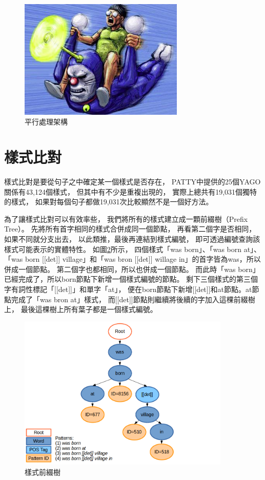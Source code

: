 \begin{figure}
    \centering
    \includegraphics[width=0.7\textwidth]{images/00-tmp-img}    %
    \caption{平行處理架構}
    \label{i:process-parallel}
\end{figure}

\section{樣式比對}
\label{s:pattern-match}

樣式比對是要從句子之中確定某一個樣式是否存在，
PATTY中提供的25個YAGO關係有43,124個樣式，
但其中有不少是重複出現的，
實際上總共有19,031個獨特的樣式，
如果對每個句子都做19,031次比較顯然不是一個好方法。

為了讓樣式比對可以有效率些，
我們將所有的樣式建立成一顆前綴樹（Prefix Tree）。
先將所有首字相同的樣式合併成同一個節點，
再看第二個字是否相同，如果不同就分支出去，
以此類推，最後再連結到樣式編號，
即可透過編號查詢該樣式可能表示的實體特性。
如圖\ref{i:pattern-prefix-tree}所示，
四個樣式「was born」、「was born at」、「was born [[det]] village」和「was bron [[det]] willage in」的首字皆為was，所以併成一個節點。
第二個字也都相同，所以也併成一個節點。
而此時「was born」已經完成了，所以born節點下新增一個樣式編號的節點。
剩下三個樣式的第三個字有詞性標記「[[det]]」和單字「at」，
便在born節點下新增[[det]]和at節點。at節點完成了「was bron at」樣式，
而[[det]]節點則繼續將後續的字加入這棵前綴樹上，
最後這棵樹上所有葉子都是一個樣式編號。

\begin{figure}
    \centering
    \includegraphics[width=0.9\textwidth]{images/03-pattern-prefix-tree}
    \caption{樣式前綴樹}
    \label{i:pattern-prefix-tree}
\end{figure}

